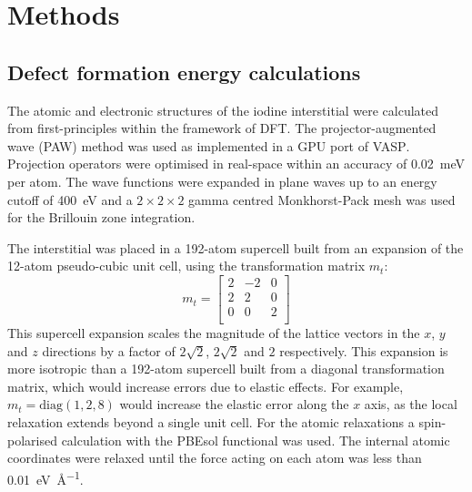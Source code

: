 \section{Methods}

\subsection{Defect formation energy calculations} \label{method:dfe}

The atomic and electronic structures of the iodine interstitial were calculated from first-principles within the framework of DFT. The projector-augmented wave (PAW) method\autocite{Blochl1994} was used as implemented in a GPU port of \textsc{VASP}.\autocite{Kresse1996a} Projection operators were optimised in real-space within an accuracy of \SI{0.02}{\milli\electronvolt} per atom. The wave functions were expanded in plane waves up to an energy cutoff of \SI{400}{\electronvolt} and a $2\! \times\!2\!\times\! 2$ gamma centred Monkhorst-Pack mesh was used for the Brillouin zone integration.

The interstitial was placed in a 192-atom supercell built from an expansion of the 12-atom pseudo-cubic unit cell, using the transformation matrix $m_t$:
$$
m_t = \begin{bmatrix}
2 & -2 & 0 \\
2 & 2 & 0 \\
0 & 0 & 2 \\
\end{bmatrix}
$$
This supercell expansion scales the magnitude of the lattice vectors in the $x$, $y$ and $z$ directions by a factor of $2\sqrt{2}$, $2\sqrt{2}$ and $2$ respectively. This expansion is more isotropic than a 192-atom supercell built from a diagonal transformation matrix, which would increase errors due to elastic effects. For example, $m_t=\mathrm{diag}(1,2,8)$ would increase the elastic error along the $x$ axis, as the local relaxation extends beyond a single unit cell.
For the atomic relaxations a spin-polarised calculation with the PBEsol functional was used.\autocite{Perdew2008a} The internal atomic coordinates were relaxed until the force acting on each atom was less than \SI{0.01}{\electronvolt\per\angstrom}. 

